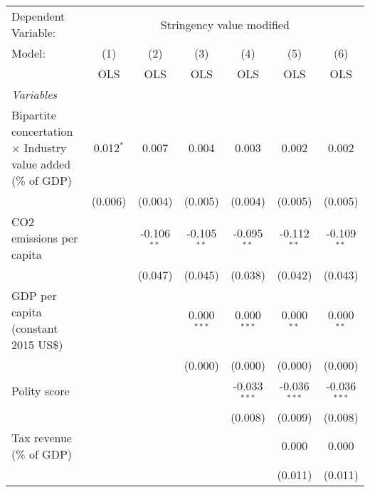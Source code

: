
\begingroup
\centering
\begin{tabular}{lcccccc}
   \toprule
   Dependent Variable: & \multicolumn{6}{c}{Stringency value modified}\\
   Model:                                                             & (1)         & (2)           & (3)           & (4)            & (5)            & (6)\\  
                                                                      &  OLS        & OLS           & OLS           & OLS            & OLS            & OLS\\  
   \midrule
   \emph{Variables}\\
   Bipartite concertation $\times$ Industry value added (\% of GDP)   & 0.012$^{*}$ & 0.007         & 0.004         & 0.003          & 0.002          & 0.002\\   
                                                                      & (0.006)     & (0.004)       & (0.005)       & (0.004)        & (0.005)        & (0.005)\\   
   CO2 emissions per capita                                           &             & -0.106$^{**}$ & -0.105$^{**}$ & -0.095$^{**}$  & -0.112$^{**}$  & -0.109$^{**}$\\   
                                                                      &             & (0.047)       & (0.045)       & (0.038)        & (0.042)        & (0.043)\\   
   GDP per capita (constant 2015 US\$)                                &             &               & 0.000$^{***}$ & 0.000$^{***}$  & 0.000$^{**}$   & 0.000$^{**}$\\   
                                                                      &             &               & (0.000)       & (0.000)        & (0.000)        & (0.000)\\   
   Polity score                                                       &             &               &               & -0.033$^{***}$ & -0.036$^{***}$ & -0.036$^{***}$\\   
                                                                      &             &               &               & (0.008)        & (0.009)        & (0.008)\\   
   Tax revenue (\% of GDP)                                            &             &               &               &                & 0.000          & 0.000\\   
                                                                      &             &               &               &                & (0.011)        & (0.011)\\   

\end{tabular}
